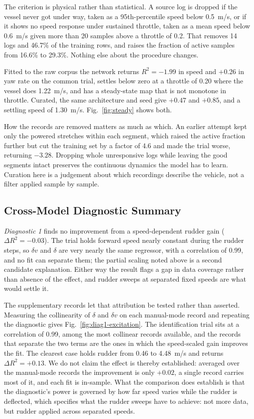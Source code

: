 \documentclass[conference]{IEEEtran}
\begin{document}
The criterion is physical rather than statistical. A source log is dropped if the vessel never got under way, taken as a 95th-percentile speed below 0.5~m/s, or if it shows no speed response under sustained throttle, taken as a mean speed below 0.6~m/s given more than 20 samples above a throttle of 0.2. That removes 14 logs and 46.7\% of the training rows, and raises the fraction of active samples from 16.6\% to 29.3\%. Nothing else about the procedure changes.

Fitted to the raw corpus the network returns $R^2=-1.99$ in speed and $+0.26$ in yaw rate on the common trial, settles below zero at a throttle of 0.20 where the vessel does 1.22~m/s, and has a steady-state map that is not monotone in throttle. Curated, the same architecture and seed give $+0.47$ and $+0.85$, and a settling speed of 1.30~m/s. Fig.~\ref{fig:steady} shows both.

How the records are removed matters as much as which. An earlier attempt kept only the powered stretches within each segment, which raised the active fraction further but cut the training set by a factor of 4.6 and made the trial worse, returning $-3.28$. Dropping whole unresponsive logs while leaving the good segments intact preserves the continuous dynamics the model has to learn. Curation here is a judgement about which recordings describe the vehicle, not a filter applied sample by sample.

\subsection{Cross-Model Diagnostic Summary}
\label{sec:diag-results}

\emph{Diagnostic 1} finds no improvement from a speed-dependent rudder gain ($\Delta R^2 = -0.03$). The trial holds forward speed nearly constant during the rudder steps, so $\delta v$ and $\delta$ are very nearly the same regressor, with a correlation of 0.99, and no fit can separate them; the partial scaling noted above is a second candidate explanation. Either way the result flags a gap in data coverage rather than absence of the effect, and rudder sweeps at separated fixed speeds are what would settle it.

The supplementary records let that attribution be tested rather than asserted. Measuring the collinearity of $\delta$ and $\delta v$ on each manual-mode record and repeating the diagnostic gives Fig.~\ref{fig:diag1-excitation}. The identification trial sits at a correlation of 0.99, among the most collinear records available, and the records that separate the two terms are the ones in which the speed-scaled gain improves the fit. The clearest case holds rudder from 0.46 to 4.48~m/s and returns $\Delta R^2 = +0.13$. We do not claim the effect is thereby established: averaged over the manual-mode records the improvement is only $+0.02$, a single record carries most of it, and each fit is in-sample. What the comparison does establish is that the diagnostic's power is governed by how far speed varies while the rudder is deflected, which specifies what the rudder sweeps have to achieve: not more data, but rudder applied across separated speeds.
\end{document}
